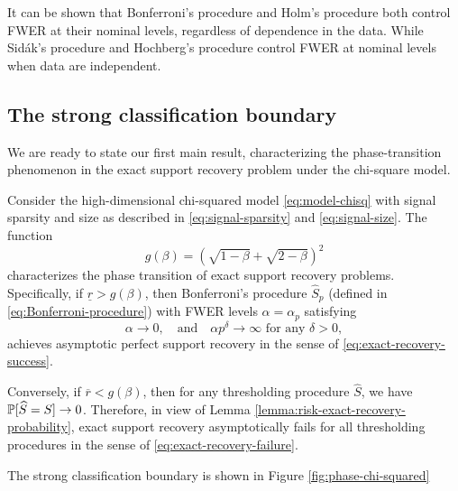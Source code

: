 It can be shown that Bonferroni's procedure and Holm's procedure both control FWER at their nominal levels, regardless of dependence in the data.
While Sid\'ak's procedure and Hochberg's procedure control FWER at nominal levels when data are independent.

\subsection{The strong classification boundary}
\label{subsec:strong-classification-boundary}

We are ready to state our first main result, characterizing the phase-transition phenomenon in the exact support recovery problem under the chi-square model.

\begin{theorem} \label{thm:chi-squred-strong-boundary}
Consider the high-dimensional chi-squared model \eqref{eq:model-chisq} with signal sparsity and size as described in \eqref{eq:signal-sparsity} and \eqref{eq:signal-size}.
The function 
\begin{equation} \label{eq:strong-classification-boundary-chisquared}
    g(\beta) = \left(\sqrt{1-\beta} + \sqrt{2-\beta}\right)^2
\end{equation}
characterizes the phase transition of exact support recovery problems.
Specifically, if $\underline{r} > {{g}}(\beta)$, then Bonferroni's procedure $\widehat{S}_p$ (defined in \eqref{eq:Bonferroni-procedure}) with FWER levels $\alpha=\alpha_p$ satisfying
\begin{equation} \label{eq:FWER-rate-to-zero}
    \alpha\to 0,\quad \text{and} \quad \alpha p^\delta\to\infty \text{  for any } \delta>0,
\end{equation}
achieves asymptotic perfect support recovery in the sense of \eqref{eq:exact-recovery-success}. 

Conversely, if $\overline{r} < {{g}}(\beta)$, then for any thresholding procedure $\widehat{S}$, we have $\P[\widehat{S}=S]\to0$.
Therefore, in view of Lemma \ref{lemma:risk-exact-recovery-probability}, exact support recovery asymptotically fails for all thresholding procedures in the sense of \eqref{eq:exact-recovery-failure}.
\end{theorem}

The strong classification boundary is shown in Figure \ref{fig:phase-chi-squared}

